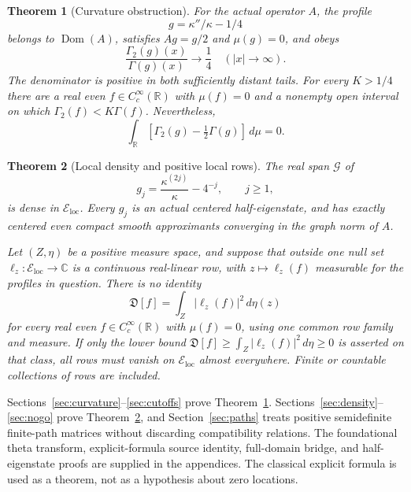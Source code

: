 \documentclass[11pt,a4paper]{article}
\numberwithin{equation}{section}
\newtheorem{theorem}{Theorem}[section]
\theoremstyle{definition}
\theoremstyle{remark}
\newcommand{\R}{\mathbb R}
\newcommand{\C}{\mathbb C}
\newcommand{\dom}{\operatorname{Dom}}
\newcommand{\Eloc}{\mathcal E_{\mathrm{loc}}}
\newcommand{\Def}{\mathfrak D}
\begin{document}
\begin{theorem}[Curvature obstruction]\label{thm:maincurvature}
For the actual operator $A$, the profile
\[
 g=\kappa''/\kappa-1/4
\]
belongs to $\dom(A)$, satisfies $Ag=g/2$ and $\mu(g)=0$, and obeys
\begin{equation}\label{eq:mainquarter}
 \frac{\Gamma_2(g)(x)}{\Gamma(g)(x)}\longrightarrow\frac14
 \quad(|x|\to\infty).
\end{equation}
The denominator is positive in both sufficiently distant tails. For every $K>1/4$ there are a real even $f\in C_c^\infty(\R)$ with $\mu(f)=0$ and a nonempty open interval on which $\Gamma_2(f)<K\Gamma(f)$. Nevertheless,
\[
 \int_\R[\Gamma_2(g)-\tfrac12\Gamma(g)]\,d\mu=0.
\]
\end{theorem}

\begin{theorem}[Local density and positive local rows]\label{thm:mainlocal}
The real span $\mathcal G$ of
\begin{equation}\label{eq:halfprofiles}
 g_j=\frac{\kappa^{(2j)}}\kappa-4^{-j},\qquad j\ge1,
\end{equation}
is dense in $\Eloc$. Every $g_j$ is an actual centered half-eigenstate, and has exactly centered even compact smooth approximants converging in the graph norm of $A$.

Let $(Z,\eta)$ be a positive measure space, and suppose that outside one null set $\ell_z:\Eloc\to\C$ is a continuous real-linear row, with $z\mapsto\ell_z(f)$ measurable for the profiles in question. There is no identity
\begin{equation}\label{eq:mainnoidentity}
 \Def[f]=\int_Z|\ell_z(f)|^2\,d\eta(z)
\end{equation}
for every real even $f\in C_c^\infty(\R)$ with $\mu(f)=0$, using one common row family and measure. If only the lower bound
$\Def[f]\ge\int_Z|\ell_z(f)|^2\,d\eta\ge0$ is asserted on that class, all rows must vanish on $\Eloc$ almost everywhere. Finite or countable collections of rows are included.
\end{theorem}

Sections~\ref{sec:curvature}--\ref{sec:cutoffs} prove Theorem~\ref{thm:maincurvature}. Sections~\ref{sec:density}--\ref{sec:nogo} prove Theorem~\ref{thm:mainlocal}, and Section~\ref{sec:paths} treats positive semidefinite finite-path matrices without discarding compatibility relations. The foundational theta transform, explicit-formula source identity, full-domain bridge, and half-eigenstate proofs are supplied in the appendices. The classical explicit formula is used as a theorem, not as a hypothesis about zero locations.
\end{document}
